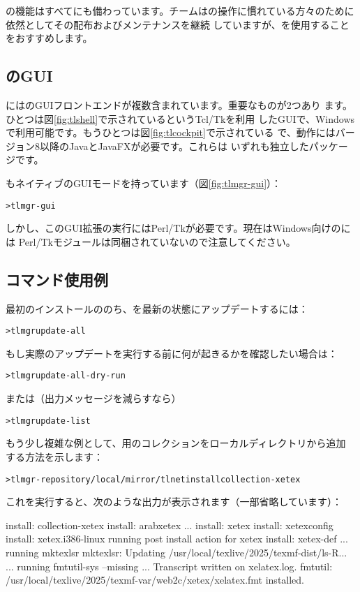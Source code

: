 \documentclass[uplatex,dvipdfmx,12pt,tombow]{jsarticle}
\begin{document}
の機能はすべてにも備わっています。\TL チームはの操作に慣れている方々のために依然としてその配布およびメンテナンスを継続
していますが、を使用することをおすすめします。

\subsection{のGUI}

\TL にはのGUIフロントエンドが複数含まれています。重要なものが2つあり
ます。ひとつは図\ref{fig:tlshell}で示されているというTcl/Tkを利用
したGUIで、Windowsで利用可能です。もうひとつは図\ref{fig:tlcockpit}で示されている
で、動作にはバージョン8以降のJavaとJavaFXが必要です。これらは
いずれも独立したパッケージです。

もネイティブのGUIモードを持っています（図\ref{fig:tlmgr-gui}）：
%
\begin{alltt}
> tlmgr -gui
\end{alltt}
%
しかし、このGUI拡張の実行にはPerl/Tkが必要です。現在はWindows向けの\TL には
Perl/Tkモジュールは同梱されていないので注意してください。

\subsection{コマンド使用例}

最初のインストールののち、\TL を最新の状態にアップデートするには：
%
\begin{alltt}
> tlmgr update -all
\end{alltt}
%
もし実際のアップデートを実行する前に何が起きるかを確認したい場合は：
%
\begin{alltt}
> tlmgr update -all -dry-run
\end{alltt}
%
または（出力メッセージを減らすなら）
%
\begin{alltt}
> tlmgr update -list
\end{alltt}

もう少し複雑な例として、\XeTeX 用のコレクションをローカルディレクトリから追加
する方法を示します：
%
\begin{alltt}
> tlmgr -repository /local/mirror/tlnet install collection-xetex
\end{alltt}
%
これを実行すると、次のような出力が表示されます（一部省略しています）：
%
\begin{fverbatim}
install: collection-xetex
install: arabxetex
...
install: xetex
install: xetexconfig
install: xetex.i386-linux
running post install action for xetex
install: xetex-def
...
running mktexlsr
mktexlsr: Updating /usr/local/texlive/2025/texmf-dist/ls-R...
...
running fmtutil-sys --missing
...
Transcript written on xelatex.log.
fmtutil: /usr/local/texlive/2025/texmf-var/web2c/xetex/xelatex.fmt installed.
\end{fverbatim}
\end{document}
